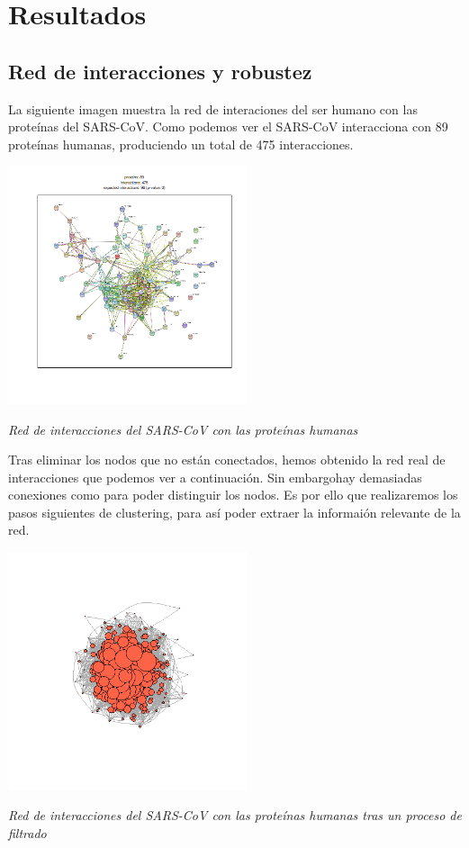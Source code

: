 
\section{Resultados}

\subsection{Red de interacciones y robustez}

La siguiente imagen muestra la red de interaciones del ser humano con las proteínas del SARS-CoV. Como podemos ver el SARS-CoV interacciona con 89 proteínas humanas, produciendo un total de 475 interacciones. 
\begin{center}
\includegraphics[width=70mm,scale=1.2]{report/figures/string_hits.png}
\caption{\textit{Red de interacciones del SARS-CoV con las proteínas humanas }}
\end{center}

Tras eliminar los nodos que no están conectados, hemos obtenido la red real de interacciones que podemos ver a continuación. Sin embargohay demasiadas conexiones como para poder distinguir los nodos. Es por ello que realizaremos los pasos siguientes de clustering, para así poder extraer la informaión relevante de la red. 
\begin{center}
\includegraphics[width=70mm,scale=1.2]{report/figures/hits.network_graph.png}
\caption{\textit{Red de interacciones del SARS-CoV con las proteínas humanas tras un proceso de filtrado}}
\end{center}

